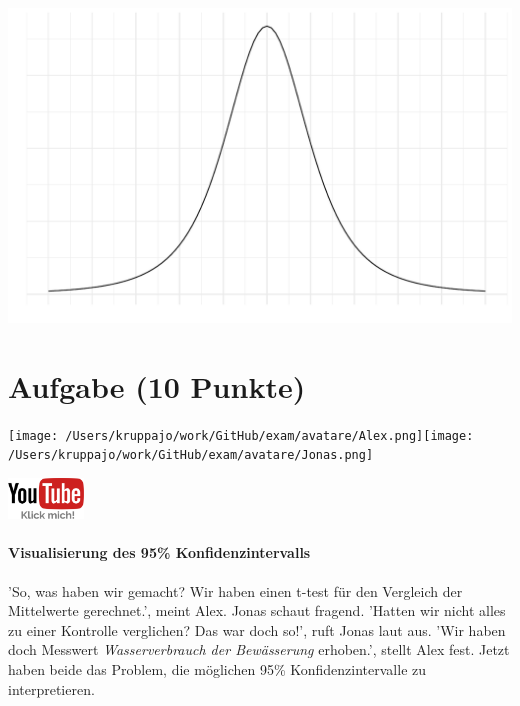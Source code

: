 \documentclass[a4paper, 9pt]{scrartcl}\usepackage[]{graphicx}\usepackage[]{xcolor}
\makeatletter
\def\maxwidth{ %
  \ifdim\Gin@nat@width>\linewidth
    \linewidth
  \else
    \Gin@nat@width
  \fi
}
\makeatother
\begin{document}
{\centering \includegraphics[width=\maxwidth]{img/statistisches-testen-3-1} 

}


 
\clearpage

\section{Aufgabe \hfill (10 Punkte)}


 
\begin{minipage}[t]{0.5\textwidth}
\texttt{[image: /Users/kruppajo/work/GitHub/exam/avatare/Alex.png]}\hspace{-4mm}\texttt{[image: /Users/kruppajo/work/GitHub/exam/avatare/Jonas.png]}
\end{minipage}
\begin{minipage}[t]{0.5\textwidth}
\hfill
\href{https://youtu.be/CN_O4fYPbhs}{\includegraphics[width = 2cm]{img/youtube}}
\end{minipage}



\paragraph{Visualisierung des 95\% Konfidenzintervalls}

'So, was haben wir gemacht? Wir haben einen t-test für den Vergleich der Mittelwerte gerechnet.', meint Alex. Jonas schaut fragend. 'Hatten wir nicht alles zu einer Kontrolle verglichen? Das war doch so!', ruft Jonas laut aus. 'Wir haben doch Messwert \textit{Wasserverbrauch der Bewässerung} erhoben.', stellt Alex fest. Jetzt haben beide das Problem, die möglichen 95\% Konfidenzintervalle zu interpretieren.
\end{document}
